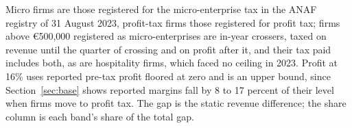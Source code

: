 \begin{table}[!tbp]\centering
\footnotesize
\caption{Fiscal magnitudes in 2023, million lei: micro-enterprise tax paid against 16 percent of reported pre-tax profit, by revenue band}\label{tab:fiscal}
\begin{minipage}{0.95\linewidth}\vspace{2pt}\footnotesize Micro firms are those registered for the micro-enterprise tax in the ANAF registry of 31 August 2023, profit-tax firms those registered for profit tax; firms above \euro{}500,000 registered as micro-enterprises are in-year crossers, taxed on revenue until the quarter of crossing and on profit after it, and their tax paid includes both, as are hospitality firms, which faced no ceiling in 2023. Profit at 16\% uses reported pre-tax profit floored at zero and is an upper bound, since Section~\ref{sec:base} shows reported margins fall by 8 to 17 percent of their level when firms move to profit tax. The gap is the static revenue difference; the share column is each band's share of the total gap.\end{minipage}
\end{table}